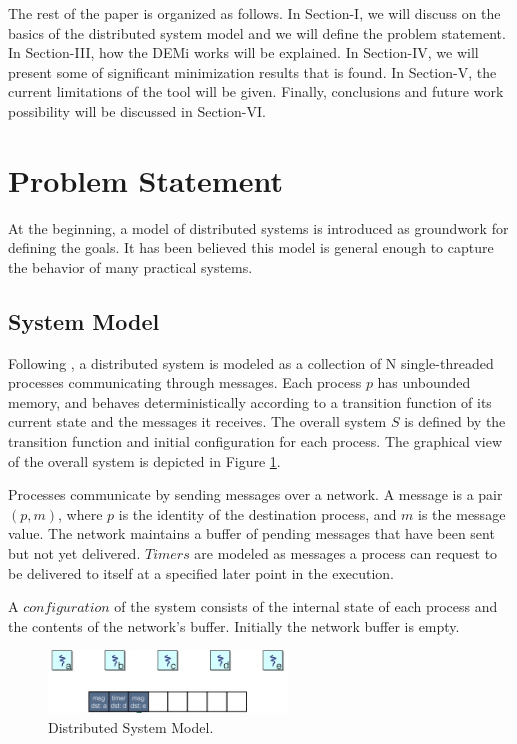 The rest of the paper is organized as follows. In Section-I, we will discuss on the basics of the distributed system model and we will define the problem statement. In Section-III, how the DEMi works will be explained. In Section-IV, we will present some of significant minimization results that is found. In Section-V, the current limitations of the tool will be given. Finally, conclusions and future work possibility will be discussed in Section-VI.


\section{Problem Statement}
At the beginning, a model of distributed systems is introduced as groundwork for defining the goals. It has been  believed this model is general enough to capture the behavior of many practical systems.

\subsection{System Model}
Following \cite{4}, a distributed system is modeled as a collection of N single-threaded processes communicating
through messages. Each process $p$ has unbounded memory, and behaves deterministically according to a transition function of its current state and the messages it receives. The overall system $S$ is defined by the transition
function and initial configuration for each process. The graphical view of the overall system is depicted in Figure \ref{system}.

Processes communicate by sending messages over a network. A message is a pair $(p,m)$, where $p$ is the identity of the destination process, and $m$ is the message value. The network maintains a buffer of pending messages that have been sent but not yet delivered. $Timers$ are modeled as messages a process can request to be delivered to itself at a specified later point in the execution.

A $configuration$ of the system consists of the internal state of each process and the contents of the network's
buffer. Initially the network buffer is empty.

\begin{figure}[!t]
\centering
\includegraphics[width=2.5in]{./image/system.png}
\caption{Distributed System Model.}
\label{system}
\setlength{\belowcaptionskip}{-3pt}
\end{figure}

